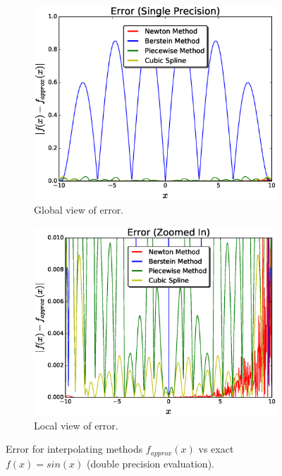 \documentclass[12pt]{article}
\theoremstyle{remark}
\begin{document}
\begin{figure}[H]
	\centering
	\begin{subfigure}{.5\textwidth}
		\centering
		\includegraphics[width=1.1\linewidth]{NerrorFig4.eps}
		\caption{Global view of error.}
		\label{fig:sub1}
	\end{subfigure}%
	\begin{subfigure}{.5\textwidth}
		\centering
		\includegraphics[width=1.1\linewidth]{NerrorFigg4.eps}
		\caption{Local view of error.}
		\label{fig:sub2}
	\end{subfigure}
	\caption{Error for interpolating methods $f_{approx}(x)$ vs exact $f(x) = sin(x)$ (double precision evaluation). }
	\label{fig:test}
\end{figure}
\end{document}
